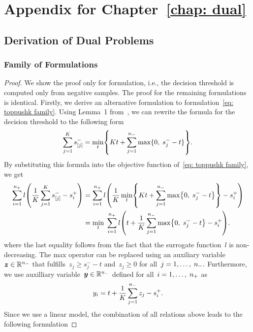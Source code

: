 \chapter{Appendix for Chapter~\ref{chap: dual}}\label{app: dual}

\section{Derivation of Dual Problems}

\subsection{Family of \TopPushK Formulations}

\topdual*
\begin{proof}
  We show the proof only for \TopPushK formulation, i.e., the decision threshold is computed only from negative samples. The proof for the remaining formulations is identical. Firstly, we derive an alternative formulation to formulation~\eqref{eq: toppushk family}. Using Lemma~1 from~\cite{ogryczak2003minimizing}, we can rewrite the formula for the decision threshold to the following form
  \begin{equation*}
    \sum_{j = 1}^{K} s^-_{[j]} = \min_{t} \Brac[c]{Kt + \sum_{j = 1}^{\nneg} \max\{0, \; s^-_j - t\}}.
  \end{equation*}
  By substituting this formula into the objective function of~\eqref{eq: toppushk family}, we get
  \begin{align*}
    \sum_{i = 1}^{\npos} l\Brac{\frac{1}{K}\sum_{j = 1}^{K} s^-_{[j]} - s^+_{i}}
      & = \sum_{i = 1}^{\npos} l\Brac{ \frac{1}{K} \min_{t} \Brac[c]{Kt + \sum_{j = 1}^{\nneg} \max\Brac[c]{0, \; s^-_j - t}} - s^+_{i}} \\
      & = \min_{t} \; \sum_{i = 1}^{\npos} l\Brac{t + \frac{1}{K} \sum_{j = 1}^{\nneg} \max\Brac[c]{0, \; s^-_j - t} - s^+_{i}}.
  \end{align*}
  where the last equality follows from the fact that the surrogate function~$l$ is non-decreasing. The max operator can be replaced using an auxiliary variable~$\bm{z} \in \mathbb{R}^{n_{-}}$ that fulfills~$z _j \geq s^-_j - t$ and~$z _j \geq 0$ for all~$j = 1, \ldots, \; n_{-}.$ Furthermore, we use auxilliary variable~$\bm{y} \in \mathbb{R}^{n_{-}}$ defined for all~$i = 1, \ldots, \; n_{+}$ as
  \begin{equation*}
    y_i = t + \frac{1}{K} \sum_{j = 1}^{n_{-}} z_j - s^+_i.
  \end{equation*}
  Since we use a linear model, the combination of all relations above leads to the following formulation

\end{proof}
